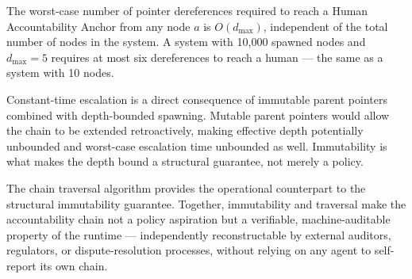 \begin{prop}
\label{prop:constant-time}
The worst-case number of pointer dereferences required to reach a Human Accountability Anchor from any node $a$ is $O(d_{\max})$, independent of the total number of nodes in the system. A system with 10,000 spawned nodes and $d_{\max} = 5$ requires at most six dereferences to reach a human — the same as a system with 10 nodes.
\end{prop}

Constant-time escalation is a direct consequence of immutable parent pointers combined with depth-bounded spawning. Mutable parent pointers would allow the chain to be extended retroactively, making effective depth potentially unbounded and worst-case escalation time unbounded as well. Immutability is what makes the depth bound a structural guarantee, not merely a policy.

The chain traversal algorithm provides the operational counterpart to the structural immutability guarantee. Together, immutability and traversal make the accountability chain not a policy aspiration but a verifiable, machine-auditable property of the runtime — independently reconstructable by external auditors, regulators, or dispute-resolution processes, without relying on any agent to self-report its own chain.

